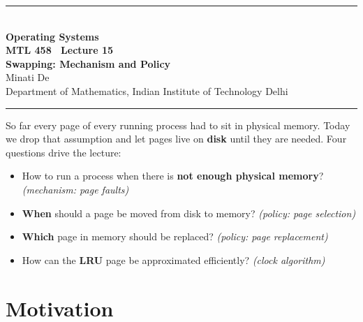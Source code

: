 \documentclass[11pt,a4paper]{article}
\begin{document}
\begin{center}
{\color{rulegray}\rule{\textwidth}{1.1pt}}\\[0.45em]
{\LARGE\bfseries Operating Systems}\\[0.25em]
{\Large\bfseries MTL 458 \textperiodcentered\ Lecture 15}\\[0.35em]
{\LARGE\bfseries Swapping: Mechanism and Policy}\\[0.35em]
{\large Minati De}\\[0.15em]
{\normalsize Department of Mathematics, Indian Institute of Technology Delhi}\\[0.35em]
{\color{rulegray}\rule{\textwidth}{1.1pt}}
\end{center}

\vspace{0.4em}
\begin{keybox}
So far every page of every running process had to sit in physical
memory. Today we drop that assumption and let pages live on
\textbf{disk} until they are needed. Four questions drive the lecture:
\begin{itemize}
  \item How to run a process when there is \textbf{not enough physical
        memory}? \hfill \emph{(mechanism: page faults)}
  \item \textbf{When} should a page be moved from disk to memory?
        \hfill \emph{(policy: page selection)}
  \item \textbf{Which} page in memory should be replaced?
        \hfill \emph{(policy: page replacement)}
  \item How can the \textbf{LRU} page be approximated efficiently?
        \hfill \emph{(clock algorithm)}
\end{itemize}
\end{keybox}

\tableofcontents
\vspace{0.6em}
\noindent{\color{rulegray}\rule{\textwidth}{0.4pt}}

\section{Motivation}
\end{document}
